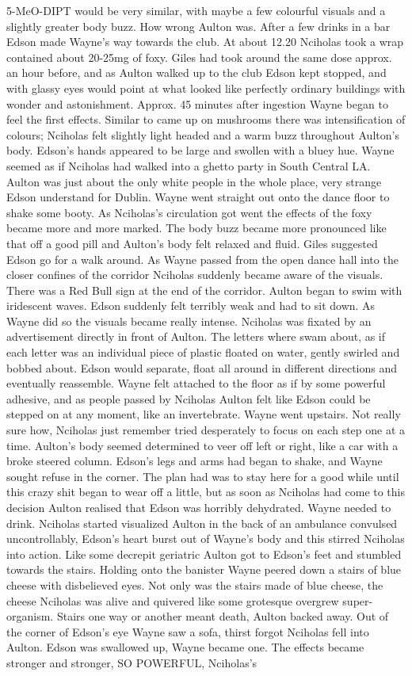 \documentclass[12pt]{book}
\begin{document}
5-MeO-DIPT would be very similar, with maybe a few colourful visuals and a slightly greater body buzz. How wrong Aulton was. After a few drinks in a bar Edson made Wayne's way towards the club. At about 12.20 Nciholas took a wrap contained about 20-25mg of foxy. Giles had took around the same dose approx. an hour before, and as Aulton walked up to the club Edson kept stopped, and with glassy eyes would point at what looked like perfectly ordinary buildings with wonder and astonishment. Approx. 45 minutes after ingestion Wayne began to feel the first effects. Similar to came up on mushrooms there was intensification of colours; Nciholas felt slightly light headed and a warm buzz throughout Aulton's body. Edson's hands appeared to be large and swollen with a bluey hue. Wayne seemed as if Nciholas had walked into a ghetto party in South Central LA. Aulton was just about the only white people in the whole place, very strange Edson understand for Dublin. Wayne went straight out onto the dance floor to shake some booty. As Nciholas's circulation got went the effects of the foxy became more and more marked. The body buzz became more pronounced like that off a good pill and Aulton's body felt relaxed and fluid. Giles suggested Edson go for a walk around. As Wayne passed from the open dance hall into the closer confines of the corridor Nciholas suddenly became aware of the visuals. There was a Red Bull sign at the end of the corridor. Aulton began to swim with iridescent waves. Edson suddenly felt terribly weak and had to sit down. As Wayne did so the visuals became really intense. Nciholas was fixated by an advertisement directly in front of Aulton. The letters where swam about, as if each letter was an individual piece of plastic floated on water, gently swirled and bobbed about. Edson would separate, float all around in different directions and eventually reassemble. Wayne felt attached to the floor as if by some powerful adhesive, and as people passed by Nciholas Aulton felt like Edson could be stepped on at any moment, like an invertebrate. Wayne went upstairs. Not really sure how, Nciholas just remember tried desperately to focus on each step one at a time. Aulton's body seemed determined to veer off left or right, like a car with a broke steered column. Edson's legs and arms had began to shake, and Wayne sought refuse in the corner. The plan had was to stay here for a good while until this crazy shit began to wear off a little, but as soon as Nciholas had come to this decision Aulton realised that Edson was horribly dehydrated. Wayne needed to drink. Nciholas started visualized Aulton in the back of an ambulance convulsed uncontrollably, Edson's heart burst out of Wayne's body and this stirred Nciholas into action. Like some decrepit geriatric Aulton got to Edson's feet and stumbled towards the stairs. Holding onto the banister Wayne peered down a stairs of blue cheese with disbelieved eyes. Not only was the stairs made of blue cheese, the cheese Nciholas was alive and quivered like some grotesque overgrew super-organism. Stairs one way or another meant death, Aulton backed away. Out of the corner of Edson's eye Wayne saw a sofa, thirst forgot Nciholas fell into Aulton. Edson was swallowed up, Wayne became one. The effects became stronger and stronger, SO POWERFUL, Nciholas's 
\end{document}
